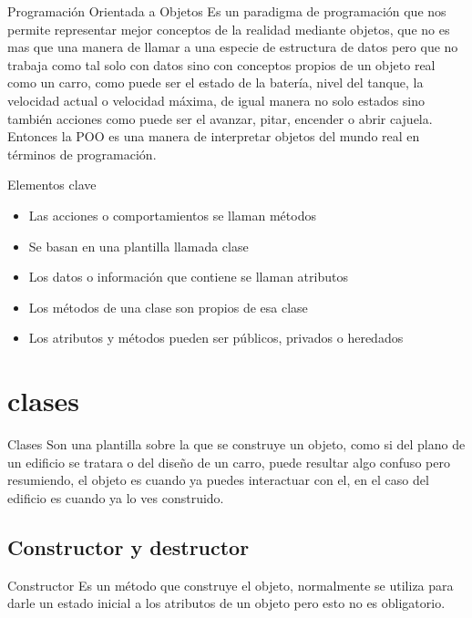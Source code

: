 \documentclass{beamer}
\begin{document}
\begin{frame}{Programaci\'on Orientada a Objetos}
	Es un paradigma de programaci\'on que nos permite representar mejor conceptos de la realidad mediante objetos, que no es mas que una manera de llamar
	a una especie de estructura de datos pero que no trabaja como tal solo con datos sino con conceptos propios de un objeto real como un carro, como puede ser 
	el estado de la bater\'ia, nivel del tanque, la velocidad actual o velocidad m\'axima, de igual manera no solo estados sino tambi\'en acciones como puede ser
	el avanzar, pitar, encender o abrir cajuela. 
	Entonces la POO es una manera de interpretar objetos del mundo real en t\'erminos de programaci\'on.
\end{frame}

\begin{frame}{Elementos clave}
	\begin{itemize}
		\item Las acciones o comportamientos se llaman m\'etodos
		\item Se basan en una plantilla llamada clase
		\item Los datos o informaci\'on que contiene se llaman atributos 
		\item  Los m\'etodos de una clase son propios de esa clase 
		\item Los atributos y m\'etodos pueden ser p\'ublicos, privados o heredados
	\end{itemize}
\end{frame}

\section{clases}

\begin{frame}{Clases}
	Son una plantilla sobre la que se construye un objeto, como si del plano de un edificio se tratara o del diseño de un carro, puede resultar algo confuso pero resumiendo, el objeto 
	es cuando ya puedes interactuar con el, en el caso del edificio es cuando ya lo ves construido.
\end{frame}


\subsection{Constructor y destructor}

\begin{frame}{Constructor}
	Es un m\'etodo que  construye el objeto, normalmente se utiliza para darle un estado inicial a los atributos de un objeto pero esto no es obligatorio.
\end{frame}
\end{document}
